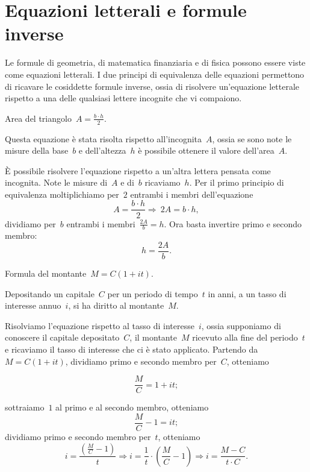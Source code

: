 \section{Equazioni letterali e formule inverse}
\label{sec:compl1_formuleinverse}

Le formule di geometria, di matematica finanziaria e di fisica possono essere 
viste come equazioni letterali.
I due principi di equivalenza delle equazioni permettono di ricavare le 
cosiddette formule inverse, ossia di risolvere
un'equazione letterale rispetto a una delle qualsiasi lettere incognite che vi 
compaiono.

 \begin{esempio}
Area del triangolo~\(A=\frac{b\cdot h}{2}\).

Questa equazione è stata risolta rispetto all'incognita~\(A\), ossia se sono 
note le misure della base~\(b\) e dell'altezza~\(h\)
è possibile ottenere il valore dell'area~\(A\).

È possibile risolvere l'equazione rispetto a un'altra lettera pensata come 
incognita.
Note le misure di~\(A\) e di~\(b\) ricaviamo~\(h\). Per il primo principio di 
equivalenza moltiplichiamo per~\(2\)
entrambi i membri dell'equazione
\[A=\frac{b\cdot h}{2}\Rightarrow~2A=b\cdot h,\]
dividiamo per~\(b\) entrambi i membri~\(\frac{2A}{b}=h\).
Ora basta invertire primo e secondo membro: \[h=\frac{2A}{b}.\]
 \end{esempio}

 \begin{esempio}
Formula del montante~\(M=C(1+it)\).

Depositando un capitale~\(C\) per un periodo di tempo~\(t\) in anni, a un tasso di 
interesse annuo~\(i\),
si ha diritto al montante~\(M\).

Risolviamo l'equazione rispetto al tasso di interesse~\(i\), ossia supponiamo di 
conoscere il capitale depositato~\(C\), il montante~\(M\)
ricevuto alla fine del periodo~\(t\) e ricaviamo il tasso di interesse che ci è 
stato applicato.
Partendo da~\(M=C(1+it)\), dividiamo primo e secondo membro per~\(C\), otteniamo 

\[\frac{M}{C}=1+it;\]

sottraiamo~\(1\) al primo e al secondo membro, otteniamo
\[\frac{M}{C}-1=it;\] dividiamo primo e secondo membro per~\(t\),
otteniamo
\[i=\frac{\left(\frac{M}{C}-1\right)}{t}\Rightarrow%
i=\frac{1}{t}\cdot \left(\frac{M}{C}-1\right)\Rightarrow 
i=\frac{M-C}{t\cdot C}.\]
 \end{esempio}

